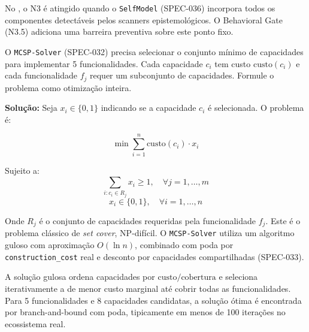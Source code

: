 No \opencodeeco{}, o N3 é atingido quando o \texttt{SelfModel}
(SPEC-036) incorpora todos os componentes detectáveis pelos scanners
epistemológicos. O Behavioral Gate (N3.5) adiciona uma barreira
preventiva sobre este ponto fixo.

\begin{exercicio}\label{exer:resol-mcsp}
O \texttt{MCSP-Solver} (SPEC-032) precisa selecionar o conjunto mínimo
de capacidades para implementar 5 funcionalidades. Cada capacidade
\(c_i\) tem custo \(\text{custo}(c_i)\) e cada funcionalidade \(f_j\)
requer um subconjunto de capacidades. Formule o problema como
otimização inteira.
\end{exercicio}

\textbf{Solução:} Seja \(x_i \in \{0,1\}\) indicando se a capacidade
\(c_i\) é selecionada. O problema é:

\[
\min \sum_{i=1}^{n} \text{custo}(c_i) \cdot x_i
\]

Sujeito a:
\[
\sum_{i: c_i \in R_j} x_i \geq 1,\quad \forall j = 1,\dots,m
\]
\[
x_i \in \{0,1\}, \quad \forall i = 1,\dots,n
\]

Onde \(R_j\) é o conjunto de capacidades requeridas pela funcionalidade
\(f_j\). Este é o problema clássico de \emph{set cover}, NP-difícil.
O \texttt{MCSP-Solver} utiliza um algoritmo guloso com aproximação
\(O(\ln n)\), combinado com poda por \texttt{construction\_cost} real
e desconto por capacidades compartilhadas (SPEC-033).

A solução gulosa ordena capacidades por \(\text{custo}/\text{cobertura}\)
e seleciona iterativamente a de menor custo marginal até cobrir todas
as funcionalidades. Para 5 funcionalidades e 8 capacidades candidatas,
a solução ótima é encontrada por branch-and-bound com poda, tipicamente
em menos de 100 iterações no ecossistema real.
